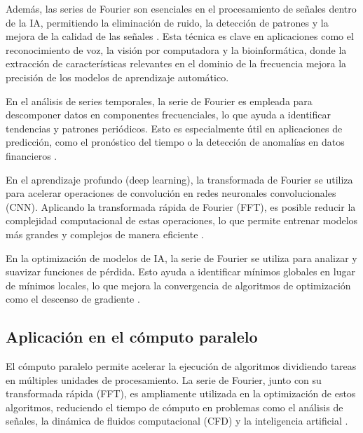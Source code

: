 {Además, las series de Fourier son esenciales en el procesamiento de señales dentro de la IA, permitiendo la eliminación de ruido, la detección de patrones y la mejora de la calidad de las señales \cite{Oppenheim1999}. Esta técnica es clave en aplicaciones como el reconocimiento de voz, la visión por computadora y la bioinformática, donde la extracción de características relevantes en el dominio de la frecuencia mejora la precisión de los modelos de aprendizaje automático.
\vspace{10pt}

En el análisis de series temporales, la serie de Fourier es empleada para descomponer datos en componentes frecuenciales, lo que ayuda a identificar tendencias y patrones periódicos. Esto es especialmente útil en aplicaciones de predicción, como el pronóstico del tiempo o la detección de anomalías en datos financieros \cite{box2015time}.
\vspace{10pt}

En el aprendizaje profundo (deep learning), la transformada de Fourier se utiliza para acelerar operaciones de convolución en redes neuronales convolucionales (CNN). Aplicando la transformada rápida de Fourier (FFT), es posible reducir la complejidad computacional de estas operaciones, lo que permite entrenar modelos más grandes y complejos de manera eficiente \cite{goodfellow2016deep}.
\vspace{10pt}

En la optimización de modelos de IA, la serie de Fourier se utiliza para analizar y suavizar funciones de pérdida. Esto ayuda a identificar mínimos globales en lugar de mínimos locales, lo que mejora la convergencia de algoritmos de optimización como el descenso de gradiente \cite{boyd2004convex}.


\subsection{Aplicación en el cómputo paralelo}

El cómputo paralelo permite acelerar la ejecución de algoritmos dividiendo tareas en múltiples unidades de procesamiento. La serie de Fourier, junto con su transformada rápida (FFT), es ampliamente utilizada en la optimización de estos algoritmos, reduciendo el tiempo de cómputo en problemas como el análisis de señales, la dinámica de fluidos computacional (CFD) y la inteligencia artificial \cite{vanloan1992computational}.
\vspace{10pt}

}
